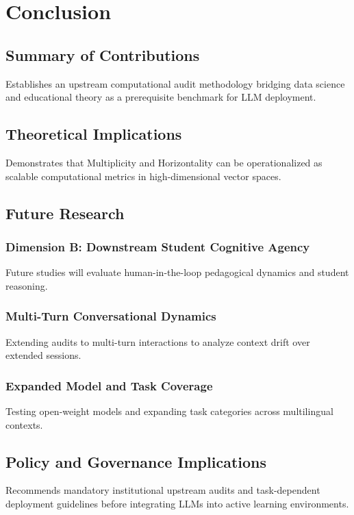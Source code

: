 
\chapter{Conclusion}
\section{Summary of Contributions}
Establishes an upstream computational audit methodology bridging data science and educational theory as a prerequisite benchmark for LLM deployment.

\section{Theoretical Implications}
Demonstrates that Multiplicity and Horizontality can be operationalized as scalable computational metrics in high-dimensional vector spaces.

\section{Future Research}
\subsection{Dimension B: Downstream Student Cognitive Agency}
Future studies will evaluate human-in-the-loop pedagogical dynamics and student reasoning.

\subsection{Multi-Turn Conversational Dynamics}
Extending audits to multi-turn interactions to analyze context drift over extended sessions.

\subsection{Expanded Model and Task Coverage}
Testing open-weight models and expanding task categories across multilingual contexts.

\section{Policy and Governance Implications}
Recommends mandatory institutional upstream audits and task-dependent deployment guidelines before integrating LLMs into active learning environments.
